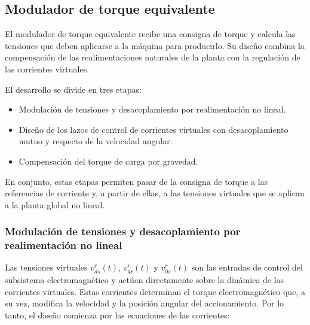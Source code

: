 \documentclass[blue,fullpaper]{ludusofficial}  %
\begin{document}
\subsection{Modulador de torque equivalente}
El modulador de torque equivalente recibe una consigna de torque y calcula las tensiones que deben aplicarse a la máquina para producirlo. Su diseño combina la compensación de las realimentaciones naturales de la planta con la regulación de las corrientes virtuales.

El desarrollo se divide en tres etapas:
\begin{itemize}
    \item Modulación de tensiones y desacoplamiento por realimentación no lineal.
    \item Diseño de los lazos de control de corrientes virtuales con desacoplamiento mutuo y respecto de la velocidad angular.
    \item Compensación del torque de carga por gravedad.
\end{itemize}

En conjunto, estas etapas permiten pasar de la consigna de torque a las referencias de corriente y, a partir de ellas, a las tensiones virtuales que se aplican a la planta global no lineal.



\subsubsection{Modulación de tensiones y desacoplamiento por realimentación no lineal}

Las tensiones virtuales $v_{ds}^{r}(t)$, $v_{qs}^{r}(t)$ y $v_{0s}^{r}(t)$ son las entradas de control del subsistema electromagnético y actúan directamente sobre la dinámica de las corrientes virtuales. Estas corrientes determinan el torque electromagnético que, a su vez, modifica la velocidad y la posición angular del accionamiento. Por lo tanto, el diseño comienza por las ecuaciones de las corrientes:
\end{document}
